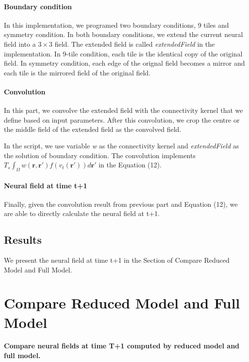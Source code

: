 \documentclass[a4paper, 12pt, english]{article}
\begin{document}
\paragraph{Boundary condition\newline}
In this implementation, we programed two boundary conditions, 9 tiles and symmetry condition.
In both boundary conditions, we extend the current neural field into a $3\times3 $ field.
The extended field is called \textit{extendedField} in the implementation.
In 9-tile condition, each tile is the identical copy of the original field.
In symmetry condition, each edge of the orignal field becomes a mirror and
each tile is the mirrored field of the original field.

\paragraph{Convolution\newline}
In this part, we convolve the extended field with the connectivity kernel
that we define based on input parameters. After this convolution, we crop the
centre or the middle field of the extended field as the convolved field.\par

In the script, we use variable \textit{w} as the connectivity kernel and
\textit{extendedField} as the solution of boundary condition.
The convolution implements
$ T_s\int_{\Omega}w(\boldsymbol{r}, \boldsymbol{r\prime})f(v_t(\boldsymbol{r\prime}))d\boldsymbol{r\prime}$
in the Equation (12).

\paragraph{Neural field at time t+1\newline}
Finally, given the convolution result from previous part and Equation (12),
we are able to directly calculate the neural field at t+1.

\subsection{Results}
We present the neural field at time t+1 in the Section of Compare Reduced Model and Full Model.
\newpage


\section{Compare Reduced Model and Full Model}
\paragraph{Compare neural fields at time T+1 computed by reduced model and full model.}
\end{document}
